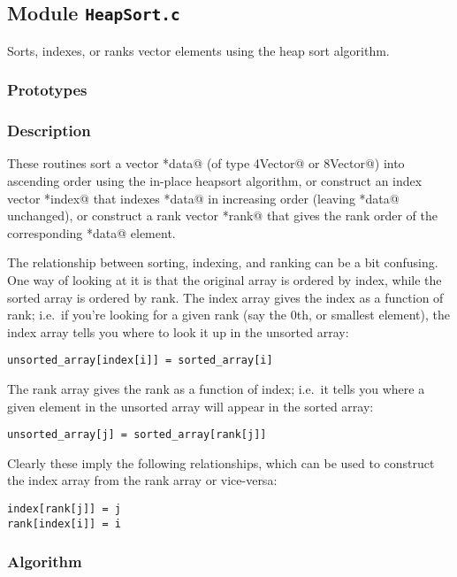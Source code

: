 
\subsection{Module \texttt{HeapSort.c}}

Sorts, indexes, or ranks vector elements using the heap sort
algorithm.

\subsubsection{Prototypes}
\vspace{0.1in}


\subsubsection{Description}

These routines sort a vector \verb@*data@ (of type \verb@REAL4Vector@
or \verb@REAL8Vector@) into ascending order using the in-place
heapsort algorithm, or construct an index vector \verb@*index@ that
indexes \verb@*data@ in increasing order (leaving \verb@*data@
unchanged), or construct a rank vector \verb@*rank@ that gives the
rank order of the corresponding \verb@*data@ element.

The relationship between sorting, indexing, and ranking can be a bit
confusing.  One way of looking at it is that the original array is
ordered by index, while the sorted array is ordered by rank.  The
index array gives the index as a function of rank; i.e.\ if you're
looking for a given rank (say the 0th, or smallest element), the index
array tells you where to look it up in the unsorted array:
\begin{verbatim}
unsorted_array[index[i]] = sorted_array[i]
\end{verbatim}
The rank array gives the rank as a function of index; i.e.\ it tells
you where a given element in the unsorted array will appear in the
sorted array:
\begin{verbatim}
unsorted_array[j] = sorted_array[rank[j]]
\end{verbatim}
Clearly these imply the following relationships, which can be used to
construct the index array from the rank array or vice-versa:
\begin{verbatim}
index[rank[j]] = j
rank[index[i]] = i
\end{verbatim}

\subsubsection{Algorithm}

